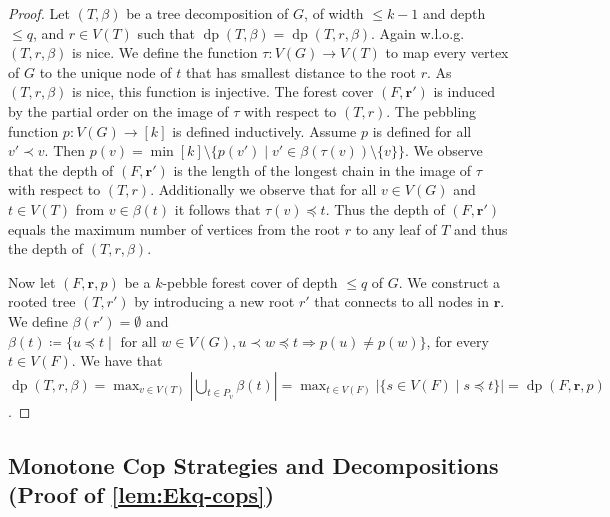 \documentclass[10pt,a4paper]{article}
\DeclareMathOperator{\dep}{dp}
\renewcommand{\vec}[1]{\ensuremath{\boldsymbol{#1}}}
\begin{document}
\begin{proof}
	Let $(T,\beta)$ be a tree decomposition of $G$, of width $\leq k-1$ and depth $\leq q$, and $r\in V(T)$ such that $\dep(T,\beta) = \dep(T,r,\beta)$.
	Again w.l.o.g. $(T,r,\beta)$ is nice.
	We define the function $\tau\colon V(G) \rightarrow V(T)$ to map every vertex of $G$ to the unique node of $t$ that has smallest distance to the root $r$.
	As $(T,r,\beta)$ is nice, this function is injective.
	The forest cover $(F,\vec{r}')$ is induced by the partial order on the image of $\tau$ with respect to $(T,r)$.
	The pebbling function $p\colon V(G) \rightarrow [k]$ is defined inductively.
	Assume $p$ is defined for all $v'\prec v$.
	Then $p(v)=\min [k]\setminus \{ p(v')\mid v'\in \beta(\tau(v))\setminus\{v\}\}$.
	We observe that the depth of $(F,\vec{r}')$ is the length of the longest chain in the image of $\tau$ with respect to $(T,r)$.
	Additionally we observe that for all $v\in V(G)$ and $t\in V(T)$ from $v\in\beta(t)$ it follows that $\tau(v)\preceq t$.
	Thus the depth of $(F,\vec{r}')$ equals the maximum number of vertices from the root $r$ to any leaf of $T$ and thus the depth of $(T,r,\beta)$.
	
	Now let $(F, \vec{r},p)$ be a $k$-pebble forest cover of depth $\leq q$ of $G$.
	We construct a rooted tree $(T,r')$ by introducing a new root $r'$ that connects to all nodes in $\vec{r}$.
	We define $\beta(r')=\emptyset$ and $\beta(t)\coloneqq \{u\preceq t\mid \text{ for all } w\in V(G), u\prec w\preceq t \Rightarrow p(u)\neq p(w) \}$, for every $t\in V(F)$.
	We have that $\dep(T,r,\beta)= \max_{v \in V(T)} \left| \bigcup_{t\in P_v} \beta(t) \right| = \max_{t\in V(F)}|\{s\in V(F)\mid s\preceq t \}|=\dep(F,\vec{r},p)$.
\end{proof}


\subsection{Monotone Cop Strategies and Decompositions (Proof of \cref{lem:Ekq-cops})}
\label{app:cr-equiv}

\crGame*
\end{document}
